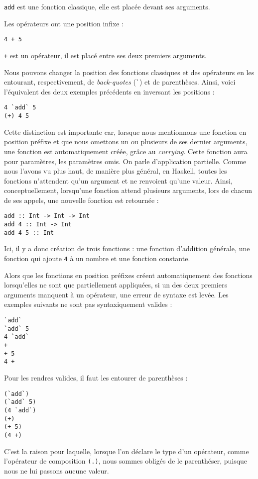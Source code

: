 \documentclass{llncs}
\begin{document}
\lstinline{add} est une fonction classique, elle est placée devant ses
arguments.

Les opérateurs ont une position infixe :
\begin{lstlisting}
4 + 5
\end{lstlisting}

\lstinline{+} est un opérateur, il est placé entre ses deux premiers
arguments.

Nous pouvons changer la position des fonctions classiques et des opérateurs en
les entourant, respectivement, de \emph{back-quotes} (\lstinline{`}) et de parenthèses.
Ainsi, voici l'équivalent des deux exemples précédents en inversant les positions :
\begin{lstlisting}
4 `add` 5
(+) 4 5
\end{lstlisting}

Cette distinction est importante car, lorsque nous mentionnons une fonction en position
préfixe et que nous omettons un ou plusieurs de ses dernier arguments, une fonction
est automatiquement créée, grâce au \emph{currying}.
Cette fonction aura pour paramètres, les paramètres omis.
On parle d'application partielle.
Comme nous l'avons vu plus haut, de manière plus général, en Haskell, toutes les
fonctions n'attendent qu'un argument et ne renvoient qu'une valeur.
Ainsi, conceptuellement, lorsqu'une fonction attend plusieurs arguments, lors de
chacun de ses appels, une nouvelle fonction est retournée :
\begin{lstlisting}
add :: Int -> Int -> Int
add 4 :: Int -> Int
add 4 5 :: Int
\end{lstlisting}
Ici, il y a donc création de trois fonctions : une fonction d'addition générale,
une fonction qui ajoute \lstinline{4} à un nombre et une fonction constante.

Alors que les fonctions en position préfixes créent automatiquement des fonctions
lorsqu'elles ne sont que partiellement appliquées, si un des deux premiers arguments
manquent à un opérateur, une erreur de syntaxe est levée.
Les exemples suivants ne sont pas syntaxiquement valides :
\begin{lstlisting}
`add`
`add` 5
4 `add`
+
+ 5
4 +
\end{lstlisting}

Pour les rendres valides, il faut les entourer de parenthèses :
\begin{lstlisting}
(`add`)
(`add` 5)
(4 `add`)
(+)
(+ 5)
(4 +)
\end{lstlisting}

C'est la raison pour laquelle, lorsque l'on déclare le type d'un opérateur, comme
l'opérateur de composition \lstinline{(.)}, nous sommes obligés de le parenthéser,
puisque nous ne lui passons aucune valeur.
\end{document}
